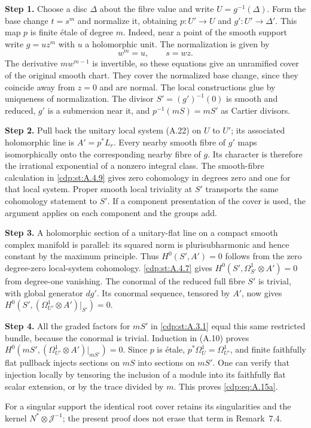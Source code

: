 \noindent\textbf{Step 1.} Choose a disc $\Delta$ about the fibre value and write $U=g^{-1}(\Delta)$. Form the base change $t=s^m$ and normalize it, obtaining $p:U'\to U$ and $g':U'\to\Delta'$. This map $p$ is finite étale of degree $m$. Indeed, near a point of the smooth support write $g=u z^m$ with $u$ a holomorphic unit. The normalization is given by
\[
 w^m=u,\qquad s=wz.
\]
The derivative $m w^{m-1}$ is invertible, so these equations give an unramified cover of the original smooth chart. They cover the normalized base change, since they coincide away from $z=0$ and are normal. The local constructions glue by uniqueness of normalization. The divisor $S'=(g')^{-1}(0)$ is smooth and reduced, $g'$ is a submersion near it, and $p^{-1}(mS)=mS'$ as Cartier divisors.

\noindent\textbf{Step 2.} Pull back the unitary local system (A.22) on $U$ to $U'$; its associated holomorphic line is $A'=p^*L_r$. Every nearby smooth fibre of $g'$ maps isomorphically onto the corresponding nearby fibre of $g$. Its character is therefore the irrational exponential of a nonzero integral class. The smooth-fibre calculation in \ref{cdp:st:A.4.9} gives zero cohomology in degrees zero and one for that local system. Proper smooth local triviality at $S'$ transports the same cohomology statement to $S'$. If a component presentation of the cover is used, the argument applies on each component and the groups add.

\noindent\textbf{Step 3.} A holomorphic section of a unitary-flat line on a compact smooth complex manifold is parallel: its squared norm is plurisubharmonic and hence constant by the maximum principle. Thus $H^0(S',A')=0$ follows from the zero degree-zero local-system cohomology. \ref{cdp:st:A.4.7} gives $H^0(S',\Omega_{S'}^1\otimes A')=0$ from degree-one vanishing. The conormal of the reduced full fibre $S'$ is trivial, with global generator $dg'$. Its conormal sequence, tensored by $A'$, now gives
$H^0(S',(\Omega_{U'}^1\otimes A')|_{S'})=0$.

\noindent\textbf{Step 4.} All the graded factors for $mS'$ in \ref{cdp:st:A.3.1} equal this same restricted bundle, because the conormal is trivial. Induction in (A.10) proves $H^0(mS',(\Omega_{U'}^1\otimes A')|_{mS'})=0$. Since $p$ is étale, $p^*\Omega_U^1=\Omega_{U'}^1$, and finite faithfully flat pullback injects sections on $mS$ into sections on $mS'$. One can verify that injection locally by tensoring the inclusion of a module into its faithfully flat scalar extension, or by the trace divided by $m$. This proves \eqref{cdp:eq:A.15a}.


For a singular support the identical root cover retains its singularities and the kernel $N^*\otimes\mathcal J^{-1}$; the present proof does not erase that term in Remark~7.4.

